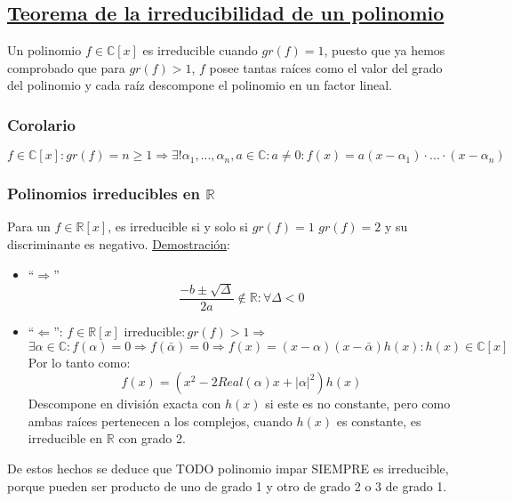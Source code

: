 \documentclass[10pt,a4paper,openright]{book}
\begin{document}
\subsection*{\underline{Teorema de la irreducibilidad de un polinomio}}
Un polinomio $f\in \mathbb C[x]$ es irreducible cuando $gr(f)=1$, puesto que ya hemos comprobado que para $gr(f)>1$, $f$ posee tantas raíces como el valor del grado del polinomio y  cada raíz descompone el polinomio en un factor lineal.

\subsubsection*{Corolario}
$$f\in \mathbb C[x]: gr(f)=n\geq 1\Rightarrow \exists!\alpha_1,...,\alpha_n, a\in \mathbb C: a\neq 0: f(x)=a(x-\alpha_1)\cdot ...\cdot (x-\alpha_n)$$

\subsubsection*{Polinomios irreducibles en $\mathbb R$}
Para un $f\in \mathbb R[x]$, es irreducible si y solo si $gr(f)=1$ $gr(f)=2$ y su discriminante es negativo.
\underline{Demostración}:
\begin{itemize}
\item ``$\Rightarrow$''
$$\frac{-b\pm \sqrt{\Delta}}{2a}\notin \mathbb R : \forall \Delta <0$$

\item ``$\Leftarrow$'': $f\in \mathbb R[x]\mbox{ irreducible}: gr(f)>1\Rightarrow$
$$\exists \alpha\in \mathbb C: f(\alpha)=0\Rightarrow f(\bar{\alpha})=0\Rightarrow f(x)=(x-\alpha)(x-\bar{\alpha})h(x): h(x)\in \mathbb C[x]$$
Por lo tanto como:
$$f(x)=(x^2-2Real(\alpha)x+|\alpha|^2)h(x)$$
Descompone en división exacta con $h(x)$ si este es no constante, pero como ambas raíces pertenecen a los complejos, cuando $h(x)$ es constante, es irreducible en $\mathbb R$ con grado 2.
\end{itemize}

De estos hechos se deduce que TODO polinomio impar SIEMPRE es irreducible, porque pueden ser producto de uno de grado 1 y otro de grado 2 o 3 de grado 1.
\end{document}
